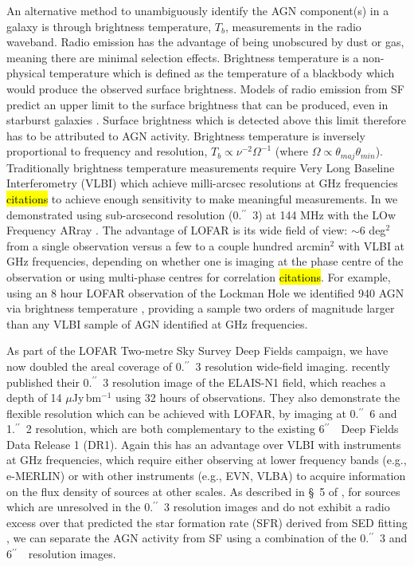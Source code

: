 \documentclass[usenatbib,fleqn,letters]{mnras}
\newcommand{\sarc}{$^{\prime\prime}\!\!$}
\begin{document}
An alternative method to unambiguously identify the AGN component(s) in a galaxy is through brightness temperature, $T_b$, measurements in the radio waveband. Radio emission has the advantage of being unobscured by dust or gas, meaning there are minimal selection effects. Brightness temperature is a non-physical temperature which is defined as the temperature of a blackbody which would produce the observed surface brightness. Models of radio emission from SF predict an upper limit to the surface brightness that can be produced, even in starburst galaxies \citep{condon_radio_1992}. Surface brightness which is detected above this limit therefore has to be attributed to AGN activity. Brightness temperature is inversely proportional to frequency and resolution, $T_b \propto \nu^{-2}\Omega^{-1}$ (where $\Omega \propto \theta_{maj}\theta_{min}$). Traditionally brightness temperature measurements require Very Long Baseline Interferometry (VLBI) which achieve milli-arcsec resolutions at GHz frequencies \hl{citations} to achieve enough sensitivity to make meaningful measurements. In \cite[][hereafter, \hl{M22}]{morabito_identifying_2022} we demonstrated using sub-arcsecond resolution (0.\sarc\ 3) at 144 MHz with the LOw Frequency ARray \citep[LOFAR;][]{van_haarlem_lofar:_2013}. The advantage of LOFAR is its wide field of view: $\sim$6 deg$^2$ from a single observation versus a few to a couple hundred arcmin$^2$ with VLBI at GHz frequencies, depending on whether one is imaging at the phase centre of the observation or using multi-phase centres for correlation \hl{citations}. For example, using an 8 hour LOFAR observation of the Lockman Hole \citep{sweijen_deep_2022} we identified 940 AGN via brightness temperature , providing a sample two orders of magnitude larger than any VLBI sample of AGN identified at GHz frequencies. 

As part of the LOFAR Two-metre Sky Survey Deep Fields \citep{sabater_lofar_2021,tasse_lofar_2021} campaign, we have now doubled the areal coverage of 0.\sarc\ 3 resolution wide-field imaging. \cite{de_jong_into_2024} recently published their 0.\sarc\ 3 resolution image of the ELAIS-N1 field, which reaches a depth of 14 $\mu$Jy$\,$bm$^{-1}$ using 32 hours of observations. They also demonstrate the flexible resolution which can be achieved with LOFAR, by imaging at 0.\sarc\ 6 and 1.\sarc\ 2 resolution, which are both complementary to the existing 6\sarc\ \ Deep Fields Data Release 1 (DR1). Again this has an advantage over VLBI with instruments at GHz frequencies, which require either observing at lower frequency bands (e.g., e-MERLIN) or with other instruments (e.g., EVN, VLBA) to acquire information on the flux density of sources at other scales. As described in \S~5 of , for sources which are unresolved in the 0.\sarc\ 3 resolution images and do not exhibit a radio excess over that predicted the star formation rate (SFR) derived from SED fitting \citep[see][for more details]{best_lofar_2023}, we can separate the AGN activity from SF using a combination of the 0.\sarc\ 3 and 6\sarc\ \ resolution images. 
\end{document}
